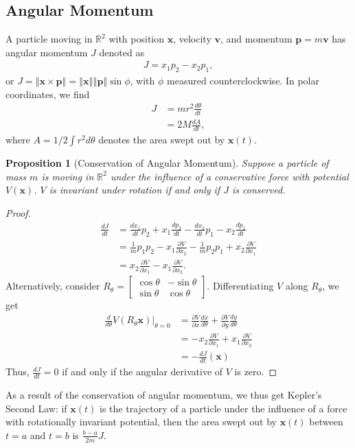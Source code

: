 \documentclass[10pt]{extarticle}
\newcommand{\R}{\mathbb{R}}
\newcommand{\norm}[1]{\left\Vert #1\right\Vert}
\theoremstyle{plain}
\newtheorem*{proposition}{Proposition}%
\theoremstyle{definition}
\theoremstyle{remark}
\renewcommand{\newline}{\hfill\break}
\begin{document}
  \subsection{Angular Momentum}%
  A particle moving in $\R^2$ with position $\mathbf{x}$, velocity $\mathbf{v}$, and momentum $\mathbf{p} = m\mathbf{v}$ has angular momentum $J$ denoted as
  \begin{align*}
    J = x_1p_2 - x_2p_1,
  \end{align*}
  or $J = \norm{\mathbf{x}\times \mathbf{p}} = \norm{\mathbf{x}}\norm{\mathbf{p}}\sin\phi$, with $\phi$ measured counterclockwise. In polar coordinates, we find
  \begin{align*}
    J &= mr^2\frac{d\theta}{dt}\\
      &= 2M\frac{dA}{dt},
  \end{align*}
  where $A= 1/2 \int r^2 d\theta$ denotes the area swept out by $\mathbf{x}(t)$.
  \begin{proposition}[Conservation of Angular Momentum]
    Suppose a particle of mass $m$ is moving in $\R^2$ under the influence of a conservative force with potential $V(\mathbf{x})$. $V$ is invariant under rotation if and only if $J$ is conserved.
  \end{proposition}
  \begin{proof}
    \begin{align*}
      \frac{dJ}{dt} &= \frac{dx_1}{dt}p_2 + x_1\frac{dp_2}{dt} - \frac{dx_2}{dt}p_1 - x_2\frac{dp_1}{dt}\\
                    &= \frac{1}{m}p_1p_2 - x_1\frac{\partial V}{\partial x_2} - \frac{1}{m}p_2p_1 + x_2\frac{\partial V}{\partial x_1}\\
                    &= x_2\frac{\partial V}{\partial x_1} - x_1\frac{\partial V}{\partial x_2}.
    \end{align*}
    Alternatively, consider $R_{\theta} = \begin{bmatrix}\cos\theta & -\sin\theta \\ \sin\theta & \cos\theta\end{bmatrix}$. Differentiating $V$ along $R_{\theta}$, we get
    \begin{align*}
      \frac{d}{d\theta}V(R_{\theta}\mathbf{x})\biggr\vert_{\theta = 0} &= \frac{\partial V}{\partial x}\frac{dx}{d\theta} + \frac{\partial V}{\partial y}\frac{dy}{d\theta}\\
                                                                       &= -x_2\frac{\partial V}{\partial x_1} + x_1\frac{\partial V}{\partial x_2}\\
                                                                       &= -\frac{dJ}{dt}\left(\mathbf{x}\right)
    \end{align*}
    Thus, $\frac{dJ}{dt} = 0$ if and only if the angular derivative of $V$ is zero.
  \end{proof}
  As a result of the conservation of angular momentum, we thus get Kepler's Second Law: if $\mathbf{x}(t)$ is the trajectory of a particle under the influence of a force with rotationally invariant potential, then the area swept out by $\mathbf{x}(t)$ between $t=a$ and $t=b$ is $\frac{b-a}{2m}J$.\newline
\end{document}
